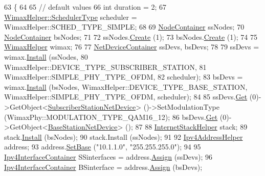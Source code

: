 \begin{DoxyCode}
63 \{
64 
65   \textcolor{comment}{// default values}
66   \textcolor{keywordtype}{int} duration = 2;
67   \hyperlink{classns3_1_1WimaxHelper_a27a40a8f601900126156781c2ca79406}{WimaxHelper::SchedulerType} scheduler = WimaxHelper::SCHED\_TYPE\_SIMPLE;
68 
69   \hyperlink{classns3_1_1NodeContainer}{NodeContainer} ssNodes;
70   \hyperlink{classns3_1_1NodeContainer}{NodeContainer} bsNodes;
71 
72   ssNodes.\hyperlink{classns3_1_1NodeContainer_a787f059e2813e8b951cc6914d11dfe69}{Create} (1);
73   bsNodes.\hyperlink{classns3_1_1NodeContainer_a787f059e2813e8b951cc6914d11dfe69}{Create} (1);
74 
75   \hyperlink{classns3_1_1WimaxHelper}{WimaxHelper} wimax;
76 
77   \hyperlink{classns3_1_1NetDeviceContainer}{NetDeviceContainer} ssDevs, bsDevs;
78 
79   ssDevs = wimax.\hyperlink{classns3_1_1WimaxHelper_a9f0848e09c4b6db9cdde9872b38f6349}{Install} (ssNodes,
80                           WimaxHelper::DEVICE\_TYPE\_SUBSCRIBER\_STATION,
81                           WimaxHelper::SIMPLE\_PHY\_TYPE\_OFDM,
82                           scheduler);
83   bsDevs = wimax.\hyperlink{classns3_1_1WimaxHelper_a9f0848e09c4b6db9cdde9872b38f6349}{Install} (bsNodes, WimaxHelper::DEVICE\_TYPE\_BASE\_STATION, 
      WimaxHelper::SIMPLE\_PHY\_TYPE\_OFDM, scheduler);
84 
85   ssDevs.\hyperlink{classns3_1_1NetDeviceContainer_a677d62594b5c9d2dea155cc5045f4d0b}{Get} (0)->GetObject<\hyperlink{classns3_1_1SubscriberStationNetDevice}{SubscriberStationNetDevice}> ()->SetModulationType 
      (WimaxPhy::MODULATION\_TYPE\_QAM16\_12);
86   bsDevs.\hyperlink{classns3_1_1NetDeviceContainer_a677d62594b5c9d2dea155cc5045f4d0b}{Get} (0)->GetObject<\hyperlink{classns3_1_1BaseStationNetDevice}{BaseStationNetDevice}> ();
87 
88   \hyperlink{classns3_1_1InternetStackHelper}{InternetStackHelper} stack;
89   stack.\hyperlink{classns3_1_1InternetStackHelper_a6645b412f31283d2d9bc3d8a95cebbc0}{Install} (bsNodes);
90   stack.Install (ssNodes);
91 
92   \hyperlink{classns3_1_1Ipv4AddressHelper}{Ipv4AddressHelper} address;
93   address.\hyperlink{classns3_1_1Ipv4AddressHelper_acf7b16dd25bac67e00f5e25f90a9a035}{SetBase} (\textcolor{stringliteral}{"10.1.1.0"}, \textcolor{stringliteral}{"255.255.255.0"});
94 
95   \hyperlink{classns3_1_1Ipv4InterfaceContainer}{Ipv4InterfaceContainer} SSinterfaces = address.\hyperlink{classns3_1_1Ipv4AddressHelper_af8e7f4a1a7e74c00014a1eac445a27af}{Assign} (ssDevs);
96   \hyperlink{classns3_1_1Ipv4InterfaceContainer}{Ipv4InterfaceContainer} BSinterface = address.\hyperlink{classns3_1_1Ipv4AddressHelper_af8e7f4a1a7e74c00014a1eac445a27af}{Assign} (bsDevs);

\end{DoxyCode}
